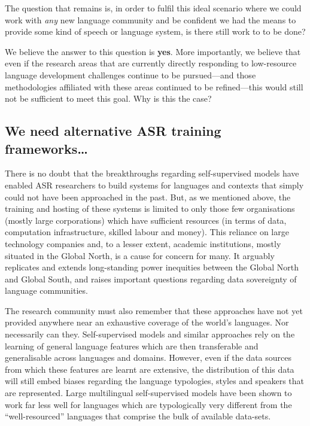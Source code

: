 \documentclass[10pt,twoside,openright]{report}
\begin{document}
The question that remains is, in order to fulfil this ideal scenario where we could work with \textit{any} new language community and be confident we had the means to provide some kind of speech or language system, is there still work to to be done? 

We believe the answer to this question is \textbf{yes}.
More importantly, we believe that even if the research areas that are currently directly responding to low-resource language development challenges continue to be pursued---and those methodologies affiliated with these areas continued to be refined---this would still not be sufficient to meet this goal.
Why is this the case?


\subsection{We need alternative ASR training frameworks\ldots} 
There is no doubt that the breakthroughs regarding self-supervised models have enabled ASR researchers to build systems for languages and contexts that simply could not have been approached in the past.
But, as we mentioned above, the training and hosting of these systems is limited to only those few organisations (mostly large corporations) which have sufficient resources (in terms of data, computation infrastructure, skilled labour and money).
This reliance on large technology companies and, to a lesser extent, academic institutions, mostly situated in the Global North, is a cause for concern for many.
It arguably replicates and extends long-standing power inequities between the Global North and Global South, and raises important questions regarding data sovereignty of language communities. 

The research community must also remember that these approaches have not yet provided anywhere near an exhaustive coverage of the world's languages.
Nor necessarily can they.
Self-supervised models and similar approaches rely on the learning of general language features which are then transferable and generalisable across languages and domains.
However, even if the data sources from which these features are learnt are extensive, the distribution of this data will still embed biases regarding the language typologies, styles and speakers that are represented.
Large multilingual self-supervised models have been shown to work far less well for languages which are typologically very different from the ``well-resourced'' languages that comprise the bulk of available data-sets. 
\end{document}
